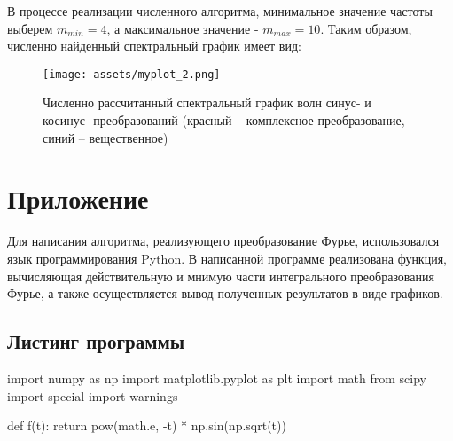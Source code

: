 \documentclass[a4paper, 14pt, titlepage, fleqn]{extarticle}
\begin{document}
\begin{specialx}
			В процессе реализации численного алгоритма, минимальное значение частоты выберем \(m_{min} = 4\), а максимальное значение - \(m_{max} = 10\). Таким образом, численно найденный спектральный график имеет вид:
			\begin{figure}[H]
				\centering
				\texttt{[image: assets/myplot\_2.png]}
				\caption[.] {Численно рассчитанный спектральный график волн синус- и косинус- преобразований (красный -- комплексное преобразование, синий -- вещественное)}
			\end{figure}
	\pagebreak


  \section{Приложение}
  Для написания алгоритма, реализующего преобразование Фурье, использовался язык программирования Python. В написанной программе реализована функция, вычисляющая действительную и мнимую части интегрального преобразования Фурье, а также осуществляется вывод полученных результатов в виде графиков.
  \subsection{Листинг программы}
  \begin{python}

import numpy as np
import matplotlib.pyplot as plt
import math
from scipy import special
import warnings


def f(t):
    return pow(math.e, -t) * np.sin(np.sqrt(t))



\end{python}
\end{specialx}
\end{document}
